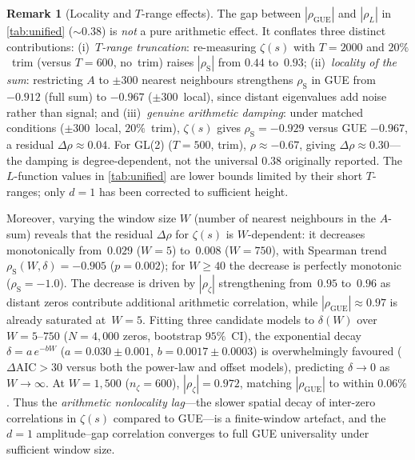 \documentclass[11pt,a4paper]{article}
\theoremstyle{plain}
\theoremstyle{definition}
\newtheorem{remark}[theorem]{Remark}
\DeclareMathOperator{\GUE}{GUE}
\begin{document}
\begin{remark}[Locality and $T$-range effects]\label{rem:locality}
The gap between $|\rho_{\GUE}|$ and $|\rho_L|$ in
\cref{tab:unified} ($\sim\!0.38$) is \emph{not} a pure arithmetic
effect.  It conflates three distinct contributions:
(i)~\emph{$T$-range truncation}: re-measuring $\zeta(s)$ with
$T = 2000$ and $20\%$~trim (versus $T = 600$, no~trim) raises
$|\rho_{\mathrm{S}}|$ from $0.44$ to~$0.93$;
(ii)~\emph{locality of the sum}: restricting $A$ to
$\pm 300$ nearest neighbours strengthens $\rho_{\mathrm{S}}$
in GUE from $-0.912$ (full sum) to $-0.967$ ($\pm 300$~local),
since distant eigenvalues add noise rather than signal; and
(iii)~\emph{genuine arithmetic damping}: under matched conditions
($\pm 300$~local, $20\%$~trim), $\zeta(s)$ gives
$\rho_{\mathrm{S}} = -0.929$ versus GUE $-0.967$, a residual
$\Delta\rho \approx 0.04$.  For GL(2) ($T = 500$, trim),
$\rho \approx -0.67$, giving $\Delta\rho \approx 0.30$---the
damping is degree-dependent, not the universal $0.38$ originally
reported.  The $L$-function values in \cref{tab:unified} are
lower bounds limited by their short $T$-ranges; only $d = 1$ has
been corrected to sufficient height.

Moreover, varying the window size $W$ (number of
nearest neighbours in the $A$-sum) reveals that the residual
$\Delta\rho$ for $\zeta(s)$ is $W$-dependent: it decreases
monotonically from~$0.029$ ($W\!=\!5$) to~$0.008$ ($W\!=\!750$),
with Spearman trend $\rho_{\mathrm{S}}(W,\delta) = -0.905$
($p = 0.002$); for $W \ge 40$ the decrease is perfectly monotonic
($\rho_{\mathrm{S}} = -1.0$).
The decrease is driven by $|\rho_\zeta|$
strengthening from~$0.95$ to~$0.96$ as distant zeros contribute
additional arithmetic correlation, while
$|\rho_{\GUE}| \approx 0.97$ is already saturated at~$W\!=\!5$.
Fitting three candidate models to $\delta(W)$ over
$W = 5$--$750$ ($N = 4{,}000$ zeros, bootstrap $95\%$~CI),
the exponential decay $\delta = a \, e^{-bW}$
($a = 0.030 \pm 0.001$, $b = 0.0017 \pm 0.0003$) is
overwhelmingly favoured ($\Delta\mathrm{AIC} > 30$ versus both
the power-law and offset models), predicting $\delta \to 0$
as $W \to \infty$.  At $W = 1{,}500$
($n_\zeta = 600$), $|\rho_\zeta| = 0.972$, matching $|\rho_{\GUE}|$
to within $0.06\%$.
Thus the \emph{arithmetic nonlocality lag}---the slower spatial
decay of inter-zero correlations in $\zeta(s)$ compared to
GUE---is a finite-window artefact, and the $d\!=\!1$ amplitude--gap
correlation converges to full GUE universality under sufficient
window size.
\end{remark}
\end{document}
